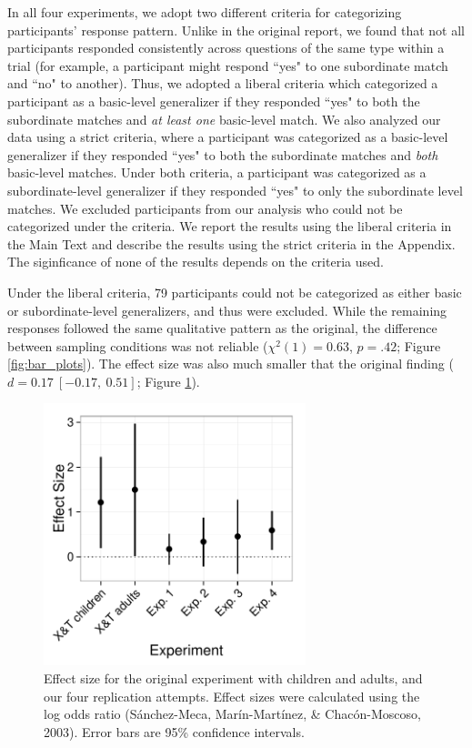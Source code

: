 \documentclass[man]{apa2}
\begin{document}
In all four experiments, we adopt two different criteria for categorizing participants' response pattern. Unlike in the original report, we found that not all participants responded consistently across questions of the same type within a trial (for example, a participant might respond ``yes" to one subordinate match and ``no" to another). Thus, we adopted a liberal criteria which categorized a participant as a basic-level generalizer if they responded ``yes" to both the subordinate matches and {\it at least one} basic-level match. We also analyzed our data using a strict criteria, where a participant was categorized as a basic-level generalizer if they responded ``yes" to both the subordinate matches and {\it both} basic-level matches.  Under both criteria, a participant was categorized as a subordinate-level generalizer if they responded ``yes" to only the subordinate level matches.  We excluded participants from our analysis who could not be categorized under the criteria. We report the results using the liberal criteria in the Main Text and describe the results using the strict criteria in the Appendix. The siginficance  of none of the results depends on the criteria used. 

Under the liberal criteria, 79 participants could not be categorized as either basic or subordinate-level generalizers, and thus were excluded. While the  remaining responses followed the same qualitative pattern as the original, the difference  between sampling conditions was not reliable ($\chi^2(1) = 0.63$,  $p = .42$; Figure \ref{fig:bar_plots}). The effect size was also much smaller that the original finding ($d = 0.17\ [-0.17,\ 0.51]$; Figure \ref{fig:effect_sizes}).

 \begin{figure} [t]
  \includegraphics[width=3in]{figures/FIG_3.pdf} 
  \caption{\label{fig:effect_sizes} Effect size for the original experiment with children and adults, and our four replication attempts.  Effect sizes were calculated using the log odds ratio (S\'{a}nchez-Meca, Mar\'{i}n-Mart\'{i}nez, \& Chac\'{o}n-Moscoso, 2003). Error bars are 95\% confidence intervals.} 
\end{figure}
\end{document}
